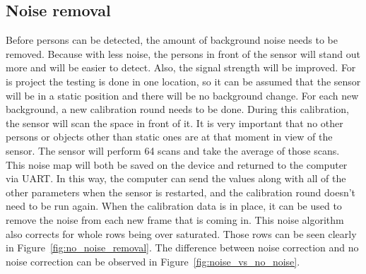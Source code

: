 
\subsection{Noise removal}
Before persons can be detected, the amount of background noise needs to be removed. Because with less noise, the persons in front of the sensor will stand out more and will be easier to detect. Also, the signal strength will be improved. For is project the testing is done in one location, so it can be assumed that the sensor will be in a static position and there will be no background change. For each new background, a new calibration round needs to be done. During this calibration, the sensor will scan the space in front of it. It is very important that no other persons or objects other than static ones are at that moment in view of the sensor. The sensor will perform 64 scans and take the average of those scans. This noise map will both be saved on the device and returned to the computer via UART. In this way, the computer can send the values along with all of the other parameters when the sensor is restarted, and the calibration round doesn't need to be run again. When the calibration data is in place, it can be used to remove the noise from each new frame that is coming in. This noise algorithm also corrects for whole rows being over saturated. Those rows can be seen clearly in Figure~\ref{fig:no_noise_removal}. The difference between noise correction and no noise correction can be observed in Figure~\ref{fig:noise_vs_no_noise}.

